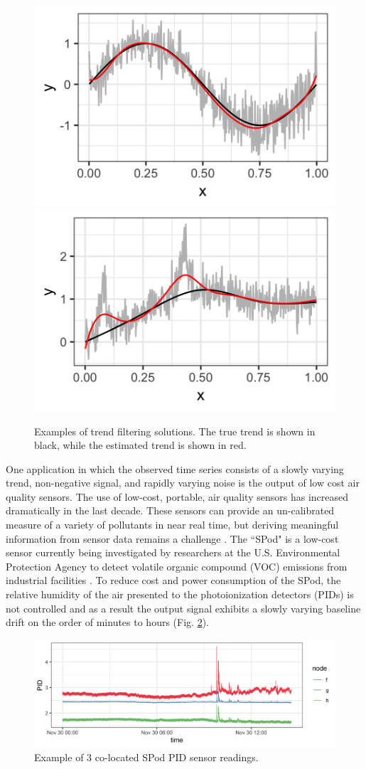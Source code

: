 \documentclass[12pt]{article}
\begin{document}
	\begin{figure}
		\label{fig:trendfilter}
		\centering
		\caption{Examples of trend filtering solutions. The true trend is shown in black, while the estimated trend is shown in red.}
		\includegraphics[width = 0.45\linewidth]{Figures/trend_filter_eg1.png}
		\includegraphics[width = 0.45\linewidth]{Figures/trend_filter_eg2.png}
	\end{figure}
	 
	
	One application in which the observed time series consists of a slowly varying trend, non-negative signal, and rapidly varying noise is the output of low cost air quality sensors. The use of low-cost, portable, air quality sensors has increased dramatically in the last decade. These sensors can provide an un-calibrated measure of a variety of pollutants in near real time, but deriving meaningful information from sensor data remains a challenge \citep{snyder2013changing}. The ``SPod" is a low-cost sensor currently being investigated by researchers at the U.S. Environmental Protection Agency to detect volatile organic compound (VOC) emissions from industrial facilities \citep{thoma2016south}. To reduce cost and power consumption of the SPod, the relative humidity of the air presented to the photoionization detectors (PIDs) is not controlled and as a result the output signal exhibits a slowly varying baseline drift on the order of minutes to hours (Fig. \ref{fig:raw_spod}). 
	 
	\begin{figure}[b!]
		\label{fig:raw_spod}
		\caption{Example of 3 co-located SPod PID sensor readings.}
		\includegraphics[width = \linewidth]{Figures/uncorrected_data.png}
	\end{figure}
   	
\end{document}
